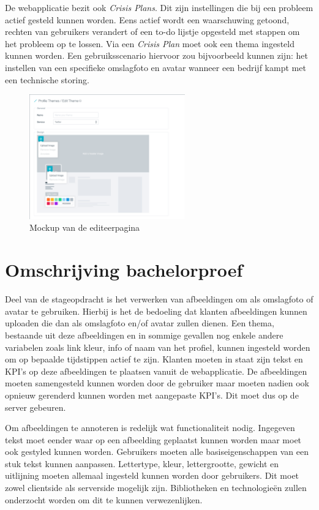 De webapplicatie bezit ook \textit{Crisis Plans}. Dit zijn instellingen die bij een probleem actief gesteld kunnen worden. Eens actief wordt een waarschuwing getoond, rechten van gebruikers verandert of een to-do lijstje opgesteld met stappen om het probleem op te lossen. Via een \textit{Crisis Plan} moet ook een thema ingesteld kunnen worden. Een gebruiksscenario hiervoor zou bijvoorbeeld kunnen zijn: het instellen van een specifieke omslagfoto en avatar wanneer een bedrijf kampt met een technische storing. 

\begin{figure}[H]
	\centering
	\includegraphics[width=0.6\textwidth]{Figuren/EditThemeMockup.png}
	\caption{Mockup van de editeerpagina \cite{EditThemeMockup}} %
	\label{fig:EditTheme}
\end{figure} 

\chapter{Omschrijving bachelorproef}
\vspace{-3cm}
Deel van de stageopdracht is het verwerken van afbeeldingen om als omslagfoto of avatar te gebruiken. Hierbij is het de bedoeling dat klanten afbeeldingen kunnen uploaden die dan als omslagfoto en/of avatar zullen dienen.  Een thema, bestaande uit deze afbeeldingen en in sommige gevallen nog enkele andere variabelen zoals link kleur, info of naam van het profiel, kunnen ingesteld worden om op bepaalde tijdstippen actief te zijn. Klanten moeten in staat zijn tekst en KPI's op deze afbeeldingen te plaatsen vanuit de webapplicatie. De afbeeldingen moeten samengesteld kunnen worden door de gebruiker maar moeten nadien ook opnieuw gerenderd kunnen worden met aangepaste KPI's. Dit moet dus op de server gebeuren. 

Om afbeeldingen te annoteren is redelijk wat functionaliteit nodig. Ingegeven tekst moet eender waar op een afbeelding geplaatst kunnen worden maar moet ook gestyled kunnen worden. Gebruikers moeten alle basiseigenschappen van een stuk tekst kunnen aanpassen. Lettertype, kleur, lettergrootte, gewicht en uitlijning moeten allemaal ingesteld kunnen worden door gebruikers. Dit moet zowel clientside als serverside mogelijk zijn. Bibliotheken en technologie\"{e}n zullen onderzocht worden om dit te kunnen verwezenlijken.
\fi  

